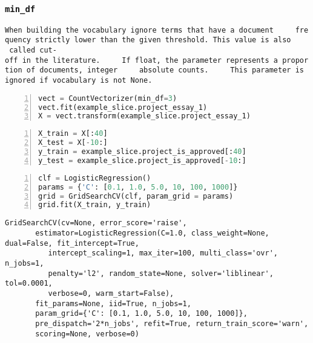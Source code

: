 \documentclass[10pt,parskip=half,
	toc=sectionentrywithdots,
	bibliography=totocnumbered,
	captions=tableheading,numbers=noendperiod]{scrartcl}
\begin{document}
\subsubsection{\texorpdfstring{\texttt{min\_df}}{min\_df}}\label{min_df}

\texttt{When\ building\ the\ vocabulary\ ignore\ terms\ that\ have\ a\ document\ \ \ \ \ frequency\ strictly\ lower\ than\ the\ given\ threshold.\ This\ value\ is\ also\ \ \ \ \ called\ cut-off\ in\ the\ literature.\ \ \ \ \ If\ float,\ the\ parameter\ represents\ a\ proportion\ of\ documents,\ integer\ \ \ \ \ absolute\ counts.\ \ \ \ \ This\ parameter\ is\ ignored\ if\ vocabulary\ is\ not\ None.}

\begin{lstlisting}[language=Python,numbers=left,xleftmargin=20pt,xrightmargin=5pt,belowskip=5pt,aboveskip=5pt]
vect = CountVectorizer(min_df=3)
vect.fit(example_slice.project_essay_1)
X = vect.transform(example_slice.project_essay_1)
\end{lstlisting}

\begin{lstlisting}[language=Python,numbers=left,xleftmargin=20pt,xrightmargin=5pt,belowskip=5pt,aboveskip=5pt]
X_train = X[:40]
X_test = X[-10:]
y_train = example_slice.project_is_approved[:40]
y_test = example_slice.project_is_approved[-10:]
\end{lstlisting}

\begin{lstlisting}[language=Python,numbers=left,xleftmargin=20pt,xrightmargin=5pt,belowskip=5pt,aboveskip=5pt]
clf = LogisticRegression()
params = {'C': [0.1, 1.0, 5.0, 10, 100, 1000]}
grid = GridSearchCV(clf, param_grid = params)
grid.fit(X_train, y_train)
\end{lstlisting}

\begin{lstlisting}[language={},postbreak={},numbers=none,xrightmargin=7pt,breakindent=0pt,aboveskip=5pt,belowskip=5pt]
GridSearchCV(cv=None, error_score='raise',
       estimator=LogisticRegression(C=1.0, class_weight=None, dual=False, fit_intercept=True,
          intercept_scaling=1, max_iter=100, multi_class='ovr', n_jobs=1,
          penalty='l2', random_state=None, solver='liblinear', tol=0.0001,
          verbose=0, warm_start=False),
       fit_params=None, iid=True, n_jobs=1,
       param_grid={'C': [0.1, 1.0, 5.0, 10, 100, 1000]},
       pre_dispatch='2*n_jobs', refit=True, return_train_score='warn',
       scoring=None, verbose=0)
\end{lstlisting}
\end{document}
